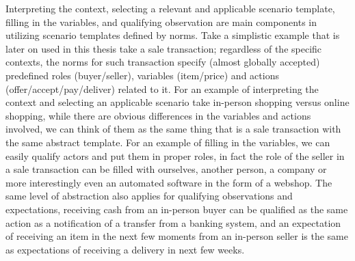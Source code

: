 Interpreting the context, selecting a relevant and applicable scenario template, filling in the variables, and qualifying observation are main components in utilizing scenario templates defined by norms. 
Take a simplistic example 
that is later on used in this thesis take a sale transaction; regardless of the specific contexts, the norms for such transaction specify (almost globally accepted) predefined roles (buyer/seller), variables (item/price) and actions (offer/accept/pay/deliver) related to it. For an example of interpreting the context and selecting an applicable scenario take in-person shopping versus online shopping, while there are obvious differences in the variables and actions involved, we can think of them as the same thing that is a sale transaction with the same abstract template. For an example of filling in the variables, we can easily qualify actors and put them in proper roles, in fact the role of the seller in a sale transaction can be filled with ourselves, another person, a company or more interestingly even an automated software in the form of a webshop. The same level of abstraction also applies for qualifying observations and expectations, receiving cash from an in-person buyer can be qualified as the same action as a notification of a transfer from a banking system, and an expectation of receiving an item in the next few moments from an in-person seller is the same as expectations of receiving a delivery in next few weeks.

